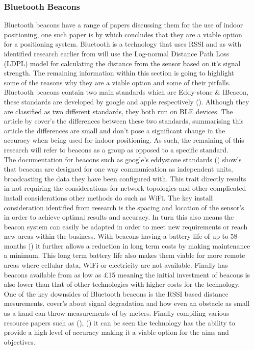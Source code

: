 \subsubsection{Bluetooth Beacons}
Bluetooth beacons have a range of papers discussing them for the use of indoor positioning, one such paper is by \cite{kingatua_2020_bluetooth} which concludes that they are a viable option for a positioning system. Bluetooth is a technology that uses RSSI and as  with identified research earlier from \cite{kontakt_ibeacon} will use the Log-normal Distance Path Loss (LDPL) model for calculating the distance from the sensor based on it's signal strength. The remaining information within this section is going to highlight some of the reasons why they are a viable option and some of their pitfalls.\\ 

Bluetooth beacons contain two main standards which are Eddy-stone \& IBeacon, these standards are developed by google and apple respectively (\cite{kontakt_ibeacon}). Although they are classified as two different standards, they both run on BLE devices. The article by \cite{kontakt_ibeacon} cover's the differences between these two standards, summarising this article the differences are small and don't pose a significant change in the accuracy when being used for indoor positioning. As such, the remaining of this research will refer to beacons as a group as opposed to a specific standard.\\

The documentation for beacons such as google's eddystone standards (\cite{google_googleeddystone}) show's that beacons are designed for one way communication as independent units, broadcasting the data they have been configured with. This trait directly results in not requiring the considerations for network topologies and other complicated install considerations other methods do such as WiFi. The key install consideration identified from research is the spacing and location of the sensor's in order to achieve optimal results and accuracy. In turn this also means the beacon system can easily be adapted in order to meet new requirements or reach new areas within the business. With beacons having a battery life of up to 58 months (\cite{beaconzone_2016_google}) it further allows a reduction in long term costs by making maintenance a minimum. This long term battery life also makes them viable for more remote areas where cellular data, WiFi or electricity are not available. Finally \cite{beaconzone_2016_google} has beacons available from as low as £15 meaning the initial investment of beacons is also lower than that of other technologies with higher costs for the technology. One of the key downsides of Bluetooth beacons is the RSSI based distance mesurements, \cite{comer_uwb_vs_ble} cover's about signal degradation and how even an obstacle as small as a hand can throw measurements of by meters. Finally compiling various resource papers such as (\cite{zhuang_2016_smartphonebased}), (\cite{kingatua_2020_bluetooth}) it can be seen the technology has the ability to provide a high level of accuracy making it a viable option for the aims and objectives.\\

